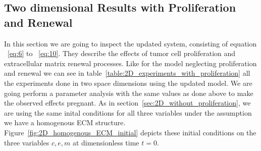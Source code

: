 \subsection{Two dimensional Results with Proliferation and Renewal}
In this section we are going to inspect the updated system, consisting of equation ~\ref{eq:6} to ~\ref{eq:10}. They describe the effects of tumor cell proliferation and extracellular matrix renewal processes. Like for the model neglecting proliferation and renewal we can see in table~\ref{table:2D_experiments_with_proliferation} all the experiments done in two space dimensions using the updated model. We are going perform a parameter analysis with the same values as done above to make the observed effects pregnant.\newline
As in section~\ref{sec:2D_without_proliferation}, we are using the same inital conditions for all three variables under the assumption we have a homogenous ECM structure. Figure~\ref{fig:2D_homogenous_ECM_initial} depicts these initial conditions on the three variables $c,e,m$ at dimensionless time $t=0$.
